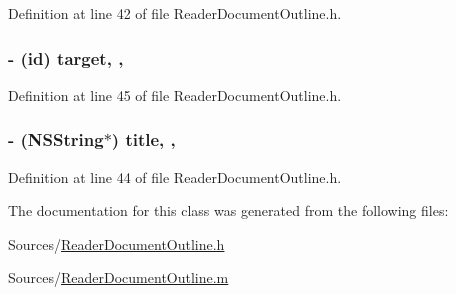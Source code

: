 Definition at line 42 of file Reader\-Document\-Outline.\-h.

\hypertarget{interface_document_outline_entry_ad722f2daed26eba405771c8eb66cd3b0}{
\subsubsection[{target}]{\setlength{\rightskip}{0pt plus 5cm}-\/ (id) target\hspace{0.3cm}{\ttfamily [read]}, {\ttfamily [nonatomic]}, {\ttfamily [strong]}}}\label{de/da0/interface_document_outline_entry_ad722f2daed26eba405771c8eb66cd3b0}


Definition at line 45 of file Reader\-Document\-Outline.\-h.

\hypertarget{interface_document_outline_entry_a4a104dd07c71a2fe72885ea24eae1492}{
\subsubsection[{title}]{\setlength{\rightskip}{0pt plus 5cm}-\/ (N\-S\-String$\ast$) title\hspace{0.3cm}{\ttfamily [read]}, {\ttfamily [nonatomic]}, {\ttfamily [strong]}}}\label{de/da0/interface_document_outline_entry_a4a104dd07c71a2fe72885ea24eae1492}


Definition at line 44 of file Reader\-Document\-Outline.\-h.



The documentation for this class was generated from the following files\-:\begin{DoxyCompactItemize}
\item 
Sources/\hyperlink{_reader_document_outline_8h}{Reader\-Document\-Outline.\-h}\item 
Sources/\hyperlink{_reader_document_outline_8m}{Reader\-Document\-Outline.\-m}\end{DoxyCompactItemize}
